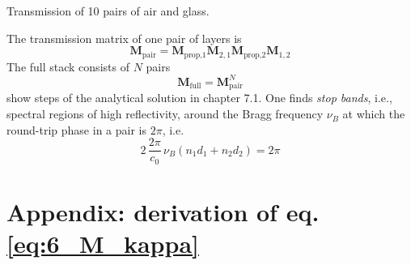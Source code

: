\begin{marginfigure}
  \caption{Transmission of 10 pairs of air and glass.}
\end{marginfigure}

The transmission matrix of one pair of layers is
\begin{equation}
  \mathbf{M}_\text{pair}
  = 
  \mathbf{M}_\text{prop,1}    \mathbf{M}_{2,1}  \mathbf{M}_\text{prop,2}    \mathbf{M}_{1,2}
\end{equation}
The full stack consists  of $N$ pairs
\begin{equation}
  \mathbf{M}_\text{full}
  = 
  \mathbf{M}_\text{pair}^N    
\end{equation}
\cite{SalehTeich1991} show steps of the analytical solution in chapter 7.1. One finds \emph{stop bands}, i.e., spectral regions of high reflectivity, around the Bragg frequency $\nu_B$ at which the round-trip phase in a pair is  $2 \pi$, i.e.
\begin{equation}
  2 \, \frac{2 \pi}{c_0} \, \nu_B \left( n_1 d_1 + n_2 d_2 \right) = 2 \pi
\end{equation}


\section{Appendix: derivation of eq. \ref{eq:6_M_kappa}}


